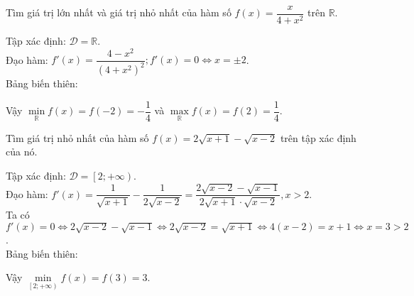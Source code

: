 \begin{vd}%
	Tìm giá trị lớn nhất và giá trị nhỏ nhất của hàm số $f(x)=\dfrac{x}{4+x^2}$ trên $\mathbb{R}$.
	\loigiai
	{Tập xác định: $\mathscr{D}=\mathbb{R}$.\\Đạo hàm: $f'(x)=\dfrac{4-x^2}{\left(4+x^2\right)^2}; f'(x)=0\Leftrightarrow x=\pm 2$.\\Bảng biến thiên:
		\begin{center}
		\end{center}
		Vậy $\min\limits_{\mathbb{R}}f(x)=f(-2)=-\dfrac{1}{4}$ và $\max\limits_{\mathbb{R}}f(x)=f(2)=\dfrac{1}{4}$.
	}
\end{vd}

\begin{vd}%
	Tìm giá trị nhỏ nhất của hàm số $f(x)=2\sqrt{x+1}-\sqrt{x-2}$ trên tập xác định của nó.
	\loigiai
	{
		Tập xác định: $\mathscr{D}=\left[2;+\infty\right)$.\\Đạo hàm: $f'(x)=\dfrac{1}{\sqrt{x+1}}-\dfrac{1}{2\sqrt{x-2}}=\dfrac{2\sqrt{x-2}-\sqrt{x-1}}{2\sqrt{x+1}\cdot\sqrt{x-2}}, x>2$.\\Ta có $f'(x)=0\Leftrightarrow 2\sqrt{x-2}-\sqrt{x-1}\Leftrightarrow 2\sqrt{x-2}=\sqrt{x+1}\Leftrightarrow 4(x-2)=x+1\Leftrightarrow x=3>2$.\\Bảng biến thiên:
		\begin{center}
		\end{center}
		Vậy $\min\limits_{\left[2;+\infty\right)}f(x)=f(3)=3$.
	}
\end{vd}

